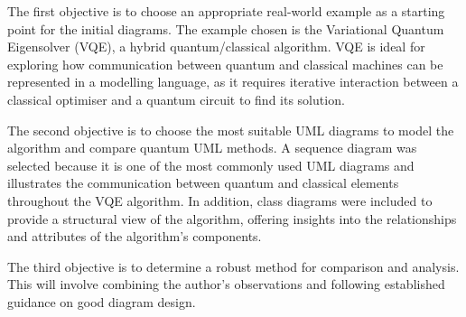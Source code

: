 \documentclass{article}
\begin{document}
The first objective is to choose an appropriate real-world example as a starting point for the initial diagrams. The example chosen is the Variational Quantum Eigensolver (VQE), a hybrid quantum/classical algorithm. VQE is ideal for exploring how communication between quantum and classical machines can be represented in a modelling language, as it requires iterative interaction between a classical optimiser and a quantum circuit to find its solution. 

The second objective is to choose the most suitable UML diagrams to model the algorithm and compare quantum UML methods. A sequence diagram was selected because it is one of the most commonly used UML diagrams and illustrates the communication between quantum and classical elements throughout the VQE algorithm. In addition, class diagrams were included to provide a structural view of the algorithm, offering insights into the relationships and attributes of the algorithm's components.

The third objective is to determine a robust method for comparison and analysis. This will involve combining the author’s observations and following established guidance on good diagram design.
\end{document}
